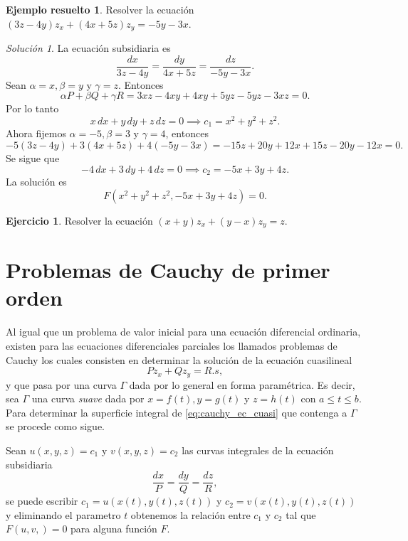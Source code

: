 \documentclass[11pt,letterpaper,draft]{report}
\theoremstyle{plain}
\theoremstyle{definition}
\newtheorem{solved}[theorem]{Ejemplo resuelto}
\newtheorem{exercise}[theorem]{Ejercicio}
\theoremstyle{remark}
\newtheorem*{solution}{Solución}
\newcommand\<{\langle}
\renewcommand\>{\rangle}
\begin{document}
\begin{solved}
  Resolver la ecuación $(3z-4y) z_x + (4x+5z) z_y = -5y -
  3x$.
  \begin{solution}
    La ecuación subsidiaria es
    \[
    \frac{dx}{3z-4y} = \frac{dy}{4x+5z} = \frac{dz}{-5y-3x}.
    \] 
    Sean $\alpha = x, \beta = y$ y $\gamma = z$. Entonces
    \[
    \alpha P + \beta Q + \gamma R = 3xz - 4xy + 4xy + 5yz -
    5yz - 3xz = 0.
    \] Por lo tanto
    \[
    x \, dx + y \, dy + z \, dz = 0 \implies c_1 = x^2 + y^2
    + z^2.
    \] 
    Ahora fijemos $\alpha = -5, \beta = 3$ y $\gamma = 4$,
    entonces
    \[
    -5(3z-4y) + 3(4x+5z) + 4(-5y-3x) = -15z + 20y + 12x +
    15z - 20y - 12x = 0.
    \]
    Se sigue que
    \[
    -4 \, dx + 3 \, dy + 4 \, dz = 0 \implies c_2 = -5x + 3y
    + 4z.
    \] 
    La solución es
    \[
    F\left(x^2+y^2+z^2, -5x + 3y + 4z\right) = 0.
    \] 
  \end{solution}
\end{solved}

\begin{exercise}
  Resolver la ecuación \((x+y)z_x + (y-x)z_y = z\).
\end{exercise}

\section{Problemas de Cauchy de primer orden}

Al igual que un problema de valor inicial para una ecuación
diferencial ordinaria, existen para las ecuaciones
diferenciales parciales los llamados problemas de Cauchy los
cuales consisten en determinar la solución de la ecuación
cuasilineal
\begin{equation}
  \label{eq:cauchy_ec_cuasi}
  P z_x + Q z_y = R.s,
\end{equation}
y que pasa por una curva $\Gamma$ dada por lo general en
forma paramétrica. Es decir, sea $\Gamma$ una curva
\textit{suave} dada por $x = f(t), y = g(t)$ y $z = h(t)$
con $a \leq t \leq b$. Para determinar la superficie
integral de \ref{eq:cauchy_ec_cuasi} que contenga a $\Gamma$
se procede como sigue.

Sean $u(x,y,z) = c_1$ y $v(x,y,z) = c_2$ las curvas
integrales de la ecuación subsidiaria
\[
\frac{dx}{P} = \frac{dy}{Q} = \frac{dz}{R},
\] 
se puede escribir $c_1 = u(x(t), y(t), z(t))$ y $c_2 =
v(x(t),y(t),z(t))$ y eliminando el parametro $t$ obtenemos
la relación entre $c_1$ y $c_2$ tal que $F(u,v,) = 0$ para
alguna función $F$.
\end{document}
